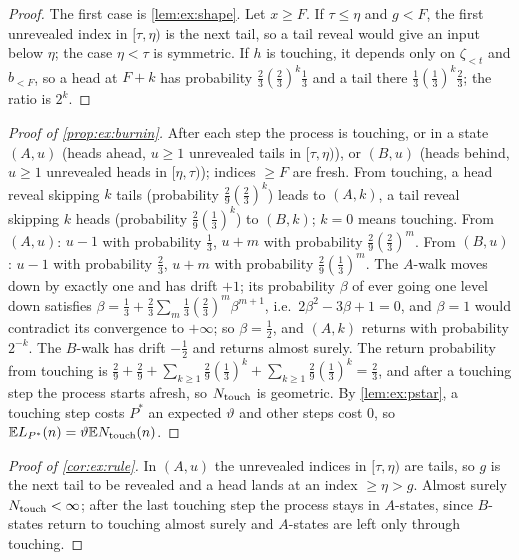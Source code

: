 \begin{proof}
The first case is \cref{lem:ex:shape}. Let $x\ge F$. If $\tau\le\eta$ and $g<F$, the first unrevealed index in $[\tau,\eta)$ is the next tail, so a tail reveal would give an input below $\eta$; the case $\eta<\tau$ is symmetric. If $h$ is touching, it depends only on $\zeta_{<t}$ and $b_{<F}$, so a head at $F+k$ has probability $\frac23(\frac23)^k\frac13$ and a tail there $\frac13(\frac13)^k\frac23$; the ratio is $2^k$.
\end{proof}

\begin{proof}[Proof of \cref{prop:ex:burnin}]
After each step the process is touching, or in a state $(A,u)$ (heads ahead, $u\ge1$ unrevealed tails in $[\tau,\eta)$), or $(B,u)$ (heads behind, $u\ge1$ unrevealed heads in $[\eta,\tau)$); indices $\ge F$ are fresh. From touching, a head reveal skipping $k$ tails (probability $\frac29(\frac23)^k$) leads to $(A,k)$, a tail reveal skipping $k$ heads (probability $\frac29(\frac13)^k$) to $(B,k)$; $k=0$ means touching. From $(A,u)$: $u-1$ with probability $\frac13$, $u+m$ with probability $\frac29(\frac23)^m$. From $(B,u)$: $u-1$ with probability $\frac23$, $u+m$ with probability $\frac29(\frac13)^m$. The $A$-walk moves down by exactly one and has drift $+1$; its probability $\beta$ of ever going one level down satisfies $\beta=\frac13+\frac23\sum_m\frac13(\frac23)^m\beta^{m+1}$, i.e.\ $2\beta^2-3\beta+1=0$, and $\beta=1$ would contradict its convergence to $+\infty$; so $\beta=\frac12$, and $(A,k)$ returns with probability $2^{-k}$. The $B$-walk has drift $-\frac12$ and returns almost surely. The return probability from touching is $\frac29+\frac29+\sum_{k\ge1}\frac29(\frac13)^k+\sum_{k\ge1}\frac29(\frac13)^k=\frac23$, and after a touching step the process starts afresh, so $N_{\rm touch}$ is geometric. By \cref{lem:ex:pstar}, a touching step costs $P^*$ an expected $\vartheta$ and other steps cost $0$, so $\mathbb{E} L_{P^*}(n)=\vartheta\mathbb{E} N_{\rm touch}(n)$.
\end{proof}

\begin{proof}[Proof of \cref{cor:ex:rule}]
In $(A,u)$ the unrevealed indices in $[\tau,\eta)$ are tails, so $g$ is the next tail to be revealed and a head lands at an index $\ge\eta>g$. Almost surely $N_{\rm touch}<\infty$; after the last touching step the process stays in $A$-states, since $B$-states return to touching almost surely and $A$-states are left only through touching.
\end{proof}

